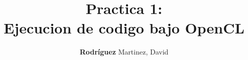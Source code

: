 \documentclass[a4, nocrop, rm, castellano]{editorialupv}
\title{
	\textbf{Practica 1:}\\
	Ejecucion de codigo bajo \textbf{OpenCL}
	\\[3ex]
	\mdseries\large
	}
\author{
	\textbf{Rodríguez} Martinez, David\\
	\\[2.5cm]
 \incluyeGrafico[width=0.4\textwidth]{logocl}
}
\begin{document}

\ifcastellano %
	\renewcommand{\itemautorefname}{punto}
	\renewcommand{\sectionautorefname}{sección}
	\renewcommand{\subsectionautorefname}{subsección}
	\renewcommand{\subsubsectionautorefname}{subsección}
	\renewcommand{\figureautorefname}{figura}
	\renewcommand{\tableautorefname}{tabla}
	
	\renewcommand{\indexname}{Índice alfabético}
	\renewcommand{\bibname}{Bibliografía}
	\renewcommand{\contentsname}{Índice general}
	\renewcommand{\abstractname}{Resumen}	
\fi

\ifvalencia %
	\renewcommand{\itemautorefname}{punt}
	\renewcommand{\sectionautorefname}{secció}
	\renewcommand{\subsectionautorefname}{subsecció}
	\renewcommand{\subsubsectionautorefname}{subsecció}
	\renewcommand{\figureautorefname}{figura}
	\renewcommand{\tableautorefname}{taula}

	\renewcommand{\indexname}{Índex alfabètic}
	\renewcommand{\bibname}{Bibliografia}
	\renewcommand{\contentsname}{Índex}
	\renewcommand{\abstractname}{Resum}	
\fi


\frontmatter


\maketitle	




\ifEPUB
\else

	\tableofcontents
\fi

\end{document}
